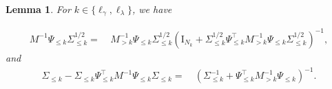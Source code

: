 \documentclass[10pt,a4paper]{amsart}
\newtheorem{lemma}{Lemma}
\begin{document}
\begin{lemma}\label{lemma trans in V2}
For $k \in \{\ell_{\gamma}, \ell_{\lambda}\}$, we have

\begin{equation*}
    \begin{aligned}
        M^{-1} \Psi_{\leq k} \Sigma_{\leq k}^{1/2} 
        = &~ 
        M_{>k}^{-1} \Psi_{\leq k} \Sigma_{\leq k}^{1/2} \left( \mathrm{I}_{N_{k}} +  \Sigma_{\leq k}^{1/2}  \Psi_{\leq k}^{\top} M_{>k}^{-1} \Psi_{\leq k} \Sigma_{\leq k}^{1/2}\right)^{-1}, 
    \end{aligned}
\end{equation*}
and 
\begin{equation*}
    \begin{aligned}
    \Sigma_{\leq k} - \Sigma_{\leq k} \Psi^{\top}_{\leq k} M^{-1} \Psi_{\leq k}\Sigma_{\leq k}
        = &~
        \left( \Sigma_{\leq k}^{-1} + \Psi_{\leq k}^{\top} M_{>k}^{-1} \Psi_{\leq k}  \right)^{-1}.
    \end{aligned}
\end{equation*}
        
\end{lemma}
\end{document}
